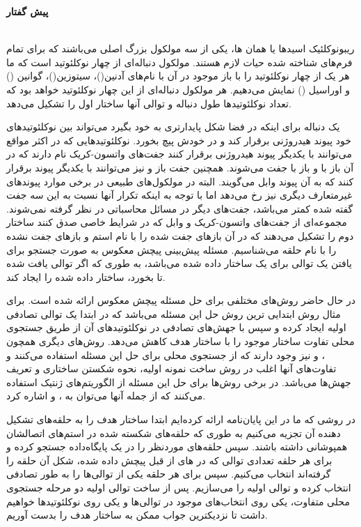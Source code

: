 \newpage
{\setlength{\baselineskip}{1.3\baselineskip}
\noindent
\centerline{\textbf{\large{پیش گفتار}}} \\
ریبونوکلئیک اسیدها یا همان  ها، یکی از سه مولکول بزرگ اصلی می‌باشند که برای تمام فرم‌های شناخته شده حیات لازم هستند. مولکول   دنباله‌ای از چهار نوکلئوتید است که ما هر یک از چهار نوکلئوتید را با باز موجود در آن با نام‌های آدنین()، سیتوزین()، گوانین () و اوراسیل () نمایش می‌دهیم. هر مولکول  دنباله‌ای از این چهار نوکلئوتید خواهد بود که تعداد نوکلئوتیدها طول دنباله و توالی آنها ساختار اول  را تشکیل می‌دهد\cite{albert}.

یک دنباله برای اینکه در فضا شکل پایدارتری به خود بگیرد می‌تواند بین نوکلئوتیدهای خود پیوند هیدروژنی برقرار کند و در خودش پیچ بخورد. نوکلئوتیدهایی که در اکثر مواقع می‌توانند با یکدیگر پیوند هیدروژنی برقرار کنند جفت‌های واتسون-کریک نام دارند که در آن باز  با  و باز  با  جفت می‌شوند. همچنین جفت باز  و  نیز می‌توانند با یکدیگر پیوند برقرار کنند که به آن پیوند وابل می‌گویند\cite{albert}. البته در مولکول‌های طبیعی در برخی موارد پیوندهای غیرمتعارف دیگری نیز رخ می‌دهد اما با توجه به اینکه تکرار آنها نسبت به این سه جفت گفته شده کمتر می‌باشد، جفت‌های دیگر در مسائل محاسباتی در نظر گرفته نمی‌شوند.
مجموعه‌ای از جفت‌های واتسون-کریک و وابل که در شرایط خاصی صدق کنند ساختار دوم  را تشکیل می‌دهند که در آن بازهای جفت شده را با نام استم و بازهای جفت نشده را با نام حلقه می‌شناسیم. مسئله پیش‌بینی پیچش معکوس  به صورت جستجو برای یافتن یک توالی برای یک ساختار داده شده می‌باشد، به طوری که اگر توالی یافت شده تا بخورد، ساختار داده شده را ایجاد کند.

در حال حاضر روش‌های مختلفی برای حل مسئله پیچش معکوس  ارائه شده است. برای مثال روش \cite{hof} ابتدایی ترین روش حل این مسئله می‌باشد که در ابتدا یک توالی تصادفی اولیه ایجاد کرده و سپس با جهش‌های تصادفی در نوکلئوتیدهای آن از طریق جستجوی محلی تفاوت ساختار موجود را با ساختار هدف کاهش می‌دهد. روش‌های دیگری همچون \cite{ander}، \cite{info} و \cite{nupack} نیز وجود دارند که از جستجوی محلی برای حل این مسئله استفاده می‌کنند و تفاوت‌های آنها اغلب در روش ساخت نمونه اولیه، نحوه شکستن ساختاری و تعریف جهش‌ها می‌باشد. در برخی روش‌ها برای حل این مسئله از الگوریتم‌های ژنتیک استفاده می‌کنند که از جمله آنها می‌توان به \cite{tadena}، \cite{frank} و \cite{tabesh} اشاره کرد.

در روشی که ما در این پایان‌نامه ارائه کرده‌ایم ابتدا ساختار هدف را به حلقه‌های تشکیل دهنده آن تجزیه می‌کنیم به طوری که حلقه‌های شکسته شده در استم‌های اتصالشان همپوشانی داشته باشند. سپس حلقه‌های موردنظر را در یک پایگاه‌داده جستجو کرده و برای هر حلقه تعدادی توالی که در های از قبل پیچش داده شده، شکل آن حلقه را گرفته‌اند انتخاب می‌کنیم. سپس برای هر حلقه یکی از توالی‌ها را به طور تصادفی انتخاب کرده و توالی اولیه را می‌سازیم. پس از ساخت توالی اولیه دو مرحله جستجوی محلی متفاوت، یکی روی انتخاب‌های موجود در توالی‌ها و یکی روی نوکلئوتیدها خواهیم داشت تا نزدیکترین جواب ممکن به ساختار هدف را بدست آوریم.

}
